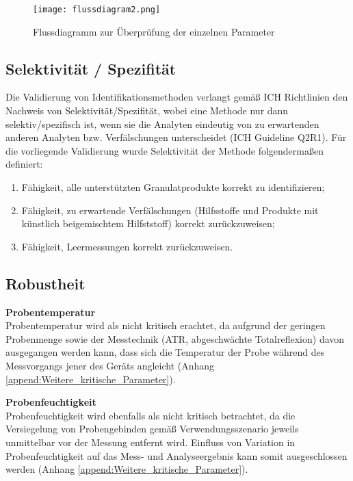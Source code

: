 \documentclass[11pt, a4paper]{article}
\begin{document}
\begin{figure}[h]
\begin{center}
\texttt{[image: flussdiagram2.png]}
\end{center}
\caption{Flussdiagramm zur Überprüfung der einzelnen Parameter}
\label{fig:Sampling_Design}
\end{figure}

\subsection{Selektivität / Spezifität}
Die Validierung von Identifikationsmethoden verlangt gemäß ICH Richtlinien den Nachweis von Selektivität/Spezifität, wobei eine Methode nur dann selektiv/spezifisch ist, wenn sie die Analyten eindeutig von zu erwartenden anderen Analyten bzw. Verfälschungen unterscheidet (ICH Guideline Q2R1). Für die vorliegende Validierung wurde Selektivität der Methode folgendermaßen definiert:
\begin{enumerate}
\item 	Fähigkeit, alle unterstützten Granulatprodukte korrekt zu identifizieren;
\item 	Fähigkeit, zu erwartende Verfälschungen (Hilfsstoffe und Produkte mit künstlich beigemischtem Hilfststoff) korrekt zurückzuweisen;
\item	Fähigkeit, Leermessungen korrekt zurückzuweisen.
\end{enumerate}

\subsection{Robustheit}
\label{sec:Robustheit}
\textbf{Probentemperatur}\\[1.2pt]
Probentemperatur wird als nicht kritisch erachtet, da aufgrund der geringen Probenmenge sowie der Messtechnik (ATR, abgeschwächte Totalreflexion) davon ausgegangen werden kann, dass sich die Temperatur der Probe während des Messvorgangs jener des Geräts angleicht (Anhang \ref{append:Weitere_kritische_Parameter}).

\textbf{Probenfeuchtigkeit}\\[1.2pt]
Probenfeuchtigkeit wird ebenfalls als nicht kritisch betrachtet, da die Versiegelung von Probengebinden gemäß Verwendungsszenario jeweils unmittelbar vor der Messung entfernt wird. Einfluss von Variation in Probenfeuchtigkeit auf das Mess- und Analyseergebnis kann somit ausgeschlossen werden (Anhang \ref{append:Weitere_kritische_Parameter}).
\end{document}
